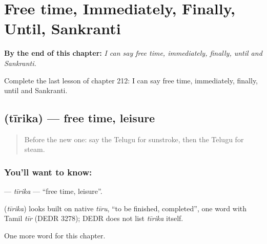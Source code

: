 
\chapter{Free time, Immediately, Finally, Until, Sankranti}
\label{ch:te-free-time-immediately-finally-until-sankranti}

\begin{chapteropening}
\textbf{By the end of this chapter:} \emph{I can say free time, immediately, finally, until and Sankranti.}

Complete the last lesson of chapter 212: I can say free time, immediately, finally, until and Sankranti.
\end{chapteropening}

\section[\texorpdfstring{\te{తీరిక} (tīrika)}{తీరిక (tīrika)}]{ (tīrika) — free time, leisure}

\label{lesson:TE-C212-tirika}



\begin{quote}
Before the new one: say the Telugu for sunstroke, then the Telugu for steam.
\end{quote}

\subsection*{You'll want to know: }
\textbf{} — \emph{tīrika} — \textquotedblleft{}free time, leisure\textquotedblright{}.

\begin{cousinweb}
\textbf{} (\emph{tīrika}) looks built on native \emph{tīru}, \textquotedblleft{}to be finished, completed\textquotedblright{}, one word with Tamil \emph{tīr} (DEDR 3278); DEDR does not list \emph{tīrika} itself.
\end{cousinweb}

\begin{grammarlens}[title={What you've built}]
One more word for this chapter.
\end{grammarlens}

